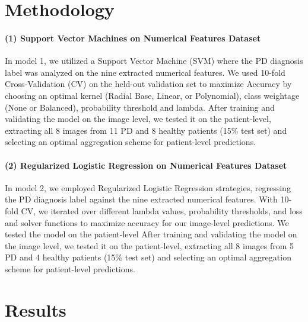 \documentclass[pmlr,twocolumn,10pt]{jmlr} %
\begin{document}
\section{Methodology}
\label{Methodology}

\label{sec:SVM}  
\paragraph{(1) Support Vector Machines on Numerical Features Dataset} In model 1, we utilized a Support Vector Machine (SVM) where the PD diagnosis label was analyzed on the nine extracted numerical features. We used 10-fold Cross-Validation (CV) on the held-out validation set to maximize Accuracy by choosing an optimal kernel (Radial Base, Linear, or Polynomial), class weightage (None or Balanced), probability threshold and lambda. After training and validating the model on the image level, we tested it on the patient-level, extracting all 8 images from 11 PD and 8 healthy patients (15\% test set) and selecting an optimal aggregation scheme for patient-level predictions.  

\label{sec:LogReg}  
\paragraph{(2) Regularized Logistic Regression on Numerical Features Dataset} In model 2, we employed Regularized Logistic Regression strategies, regressing the PD diagnosis label against the nine extracted numerical features. With 10-fold CV, we iterated over different lambda values, probability thresholds, and loss and solver functions to maximize accuracy for our image-level predictions. We tested the model on the patient-level After training and validating the model on the image level, we tested it on the patient-level, extracting all 8 images from 5 PD and 4 healthy patients (15\% test set) and selecting an optimal aggregation scheme for patient-level predictions.  

\section{Results}
\label{Results}
\end{document}
